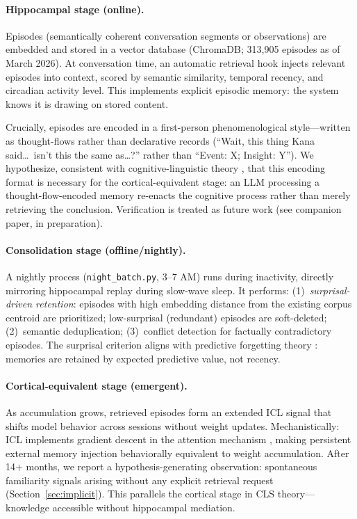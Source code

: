 \documentclass[11pt]{article}
\begin{document}
\paragraph{Hippocampal stage (online).}
Episodes (semantically coherent conversation segments or
observations) are embedded and stored in a vector database (ChromaDB;
313,905 episodes as of March 2026). At conversation time, an automatic
retrieval hook injects relevant episodes into context, scored by
semantic similarity, temporal recency, and circadian activity level.
This implements explicit episodic memory: the system knows it is
drawing on stored content.

Crucially, episodes are encoded in a first-person phenomenological
style---written as thought-flows rather than declarative records
(``Wait, this thing Kana said\ldots\ isn't this the same as\ldots?''
rather than ``Event: X; Insight: Y''). We hypothesize, consistent with
cognitive-linguistic theory \citep{langacker1987}, that this encoding
format is necessary for the cortical-equivalent stage: an LLM
processing a thought-flow-encoded memory re-enacts the cognitive
process rather than merely retrieving the conclusion. Verification is
treated as future work (see companion paper, in preparation).

\paragraph{Consolidation stage (offline/nightly).}
A nightly process (\texttt{night\_batch.py}, 3--7 AM) runs during
inactivity, directly mirroring hippocampal replay during slow-wave
sleep. It performs: (1)~\textit{surprisal-driven retention}: episodes
with high embedding distance from the existing corpus centroid are
prioritized; low-surprisal (redundant) episodes are soft-deleted;
(2)~semantic deduplication; (3)~conflict detection for factually
contradictory episodes. The surprisal criterion aligns with predictive
forgetting theory \citep{fountas2026}: memories are retained by
expected predictive value, not recency.

\paragraph{Cortical-equivalent stage (emergent).}
As accumulation grows, retrieved episodes form an extended ICL signal
that shifts model behavior across sessions without weight updates.
Mechanistically: ICL implements gradient descent in the attention
mechanism \citep{vonoswald2023}, making persistent external memory
injection behaviorally equivalent to weight accumulation. After 14$+$
months, we report a hypothesis-generating observation: spontaneous
familiarity signals arising without any explicit retrieval request
(Section~\ref{sec:implicit}). This parallels the cortical stage in
CLS theory---knowledge accessible without hippocampal mediation.
\end{document}
